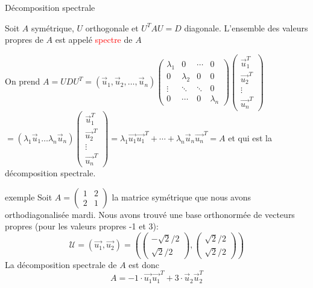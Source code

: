 \begin{parag}{Décomposition spectrale}
    \begin{definition}
        Soit $A$ symétrique, $U$ orthogonale et $U^TAU = D$ diagonale. L'ensemble des valeurs propres de $A$ est appelé \textcolor{red}{spectre} de $A$
    \end{definition}
    On prend $A =UDU^T = (\vec{u}_1, \vec{u}_2, \dots, \vec{u}_n)\begin{pmatrix}
        \lambda_1 & 0 & \cdots & 0\\
        0 & \lambda_2 & 0 & 0\\
        \vdots & \ddots & \ddots & 0\\
        0 & \cdots & 0 & \lambda_n
    \end{pmatrix}\begin{pmatrix}
        \vec{u}_1^T\\ \vec{u_2}^T\\
        \vdots \\
        \vec{u_n}^T
    \end{pmatrix}$
    \\
    $= (\lambda_1\vec{u}_1\dots\lambda_n\vec{u}_n)\begin{pmatrix}
        \vec{u}_1^T\\ \vec{u_2}^T\\
        \vdots \\
        \vec{u_n}^T
    \end{pmatrix} = \lambda_1\vec{u_1}\vec{u_1}^T + \cdots + \lambda_n\vec{u}_n\vec{u_n}^T = A$ et qui est la décomposition spectrale.
    \begin{subparag}{exemple}
        Soit $A = \begin{pmatrix}
            1 & 2 \\ 2 & 1
        \end{pmatrix}$ la matrice symétrique que nous avons orthodiagonalisée mardi. Nous avons trouvé une base orthonormée de vecteurs propres (pour les valeurs propres -1 et 3):
        \[\mathcal{U} = (\vec{u_1}, \vec{u_2}) = \left(\begin{pmatrix}
            -\sqrt{2}/2 \\
            \sqrt{2}/2
        \end{pmatrix}, \begin{pmatrix}
            \sqrt{2}/2 \\ \sqrt{2}/2
        \end{pmatrix}\right)\]
        La décomposition spectrale de $A$ est donc
        \[A = -1\cdot\vec{u_1}\vec{u_1}^T + 3\cdot\vec{u}_2\vec{u}_2^T\]
    \end{subparag}
\end{parag}


